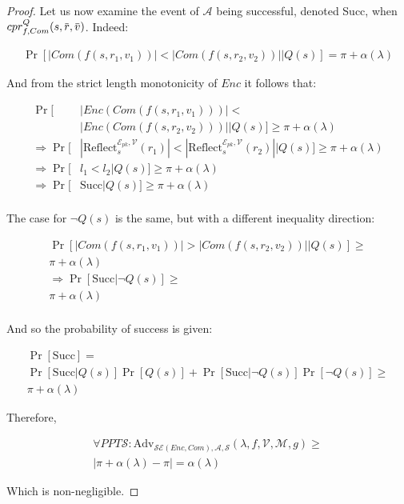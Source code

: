 \documentclass{sig-alternate-05-2015}
\newcommand{\overbar}[1]{\mkern 1.5mu\overline{\mkern-1.5mu#1\mkern-1.5mu}\mkern 1.5mu}
\begin{document}
\begin{proof}
Let us now examine the event of $\mathcal{A}$ being successful, denoted Succ,
when $cpr^Q_{f, Com}(s, \overbar{r}, \overbar{v})$. Indeed:

\begin{align*}
    \Pr[|Com(f(s, r_1, v_1))| < |Com(f(s, r_2, v_2))||Q(s)]
    = \pi + \alpha(\lambda)
\end{align*}

And from the strict length monotonicity of $Enc$ it follows that:

\begin{align*}
    \Pr[&|Enc(Com(f(s, r_1, v_1)))| <\\&|Enc(Com(f(s, r_2, v_2)))||Q(s)]
        \geq \pi + \alpha(\lambda)\\
    \Rightarrow \Pr[&
        |\text{Reflect}^{\mathcal{E}_{pk}, \mathcal{V}}_s(r_1)|
        <
        |\text{Reflect}^{\mathcal{E}_{pk}, \mathcal{V}}_s(r_2)||Q(s)
    ]
        \geq \pi + \alpha(\lambda)\\
    \Rightarrow \Pr[&l_1 < l_2|Q(s)]
        \geq \pi + \alpha(\lambda)\\
    \Rightarrow \Pr[&\text{Succ}|Q(s)]
        \geq \pi + \alpha(\lambda)\\
\end{align*}

The case for $\lnot Q(s)$ is the same, but with a different inequality direction:

\begin{align*}
    \Pr[|Com(f(s, r_1, v_1))| > |Com(f(s, r_2, v_2))||Q(s)]
        \geq\\
        \pi + \alpha(\lambda)\\
    \Rightarrow \Pr[\text{Succ}|\lnot Q(s)] \geq\\
    \pi + \alpha(\lambda)\\
\end{align*}

And so the probability of success is given:

\begin{align*}
    \Pr[\text{Succ}] =\\
    \Pr[\text{Succ}|Q(s)]\Pr[Q(s)]
    +
    \Pr[\text{Succ}|\lnot Q(s)]\Pr[\lnot Q(s)] \geq\\
    \pi + \alpha(\lambda)
\end{align*}

Therefore,

\begin{align*}
    \forall PPT \mathcal{S}:
    \text{Adv}_{\mathcal{SE}(Enc, Com), \mathcal{A}, \mathcal{S}}
        (\lambda, f, \mathcal{V}, \mathcal{M}, g)
    \geq\\
    |\pi + \alpha(\lambda) - \pi| = \alpha(\lambda)
\end{align*}

Which is non-negligible.

\end{proof}
\end{document}
